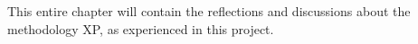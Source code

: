 This entire chapter will contain the reflections and discussions about the methodology XP, as experienced in this project.